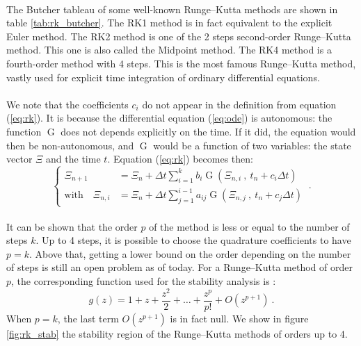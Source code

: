         \paragraph{}
        The Butcher tableau of some well-known Runge--Kutta methods are shown in table \ref{tab:rk_butcher}.
        The RK1 method is in fact equivalent to the explicit Euler method.
        The RK2 method is one of the 2 steps second-order Runge--Kutta method.
        This one is also called the Midpoint method.
        The RK4 method is a fourth-order method with 4 steps.
        This is the most famous Runge--Kutta method, vastly used for explicit time integration of ordinary differential equations.

        \paragraph{}
        We note that the coefficients $c_i$ do not appear in the definition from equation (\ref{eq:rk}).
        It is because the differential equation (\ref{eq:ode}) is autonomous: the function $\operatorname{G}$ does not depends explicitly on the time.
        If it did, the equation would then be non-autonomous, and $\operatorname{G}$ would be a function of two variables: the state vector $\Xi$ and the time $t$.
        Equation (\ref{eq:rk}) becomes then:
        \begin{equation}
          \left\{\begin{aligned}
            \Xi_{n+1} &= \Xi_n + \Delta t \sum_{i = 1}^k b_i \operatorname{G}\left(\Xi_{n,i} \ ,\  t_n + c_i \Delta t\right) \\
            \textrm{with}\quad \Xi_{n,i} &= \Xi_n + \Delta t \sum_{j = 1}^{i-1} a_{ij} \operatorname{G}\left(\Xi_{n,j} \ ,\  t_n + c_j \Delta t\right)
          \end{aligned}\right. \ .
        \end{equation}

        \paragraph{}
        It can be shown that the order $p$ of the method is less or equal to the number of steps $k$.
        Up to 4 steps, it is possible to choose the quadrature coefficients to have $p = k$.
        Above that, getting a lower bound on the order depending on the number of steps is still an open problem as of today.
        For a Runge--Kutta method of order $p$, the corresponding function used for the stability analysis is \cite{HairerWanner1996}:
        \begin{equation}
          g\left(z\right) = 1 + z + \frac{z^2}{2} + \dots + \frac{z^p}{p!} + O\left(z^{p+1}\right) \ .
        \end{equation}
        When $p = k$, the last term $O\left(z^{p+1}\right)$ is in fact null.
        We show in figure \ref{fig:rk_stab} the stability region of the Runge--Kutta methods of orders up to 4.

